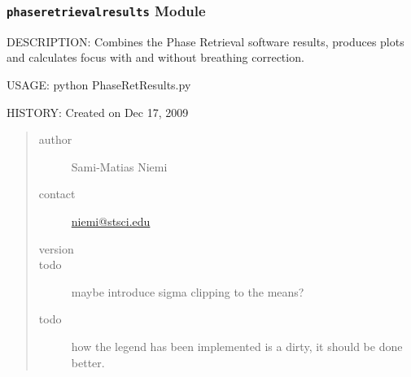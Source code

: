 \documentclass[letterpaper,10pt,english]{sphinxmanual}
\begin{document}

\begin{fulllineitems}
\label{SamPy.focus:SamPy.focus.collect_focus.writeOutput}
\end{fulllineitems}



\subsubsection{\texttt{phaseretrievalresults} Module}
\label{SamPy.focus:phaseretrievalresults-module}\label{SamPy.focus:module-SamPy.focus.phaseretrievalresults}
DESCRIPTION:
Combines the Phase Retrieval software results, produces plots
and calculates focus with and without breathing correction.

USAGE:
python PhaseRetResults.py

HISTORY:
Created on Dec 17, 2009
\begin{quote}\begin{description}
\item[{author}] \leavevmode
Sami-Matias Niemi

\item[{contact}] \leavevmode
\href{mailto:niemi@stsci.edu}{niemi@stsci.edu}

\item[{version}] 

\item[{todo}] \leavevmode
maybe introduce sigma clipping to the means?

\item[{todo}] \leavevmode
how the legend has been implemented is a dirty,
it should be done better.

\end{description}\end{quote}

\end{document}
